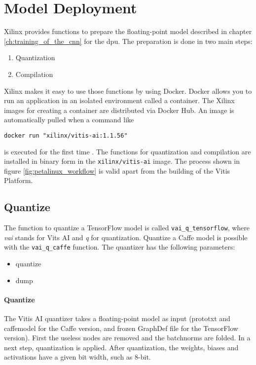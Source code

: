 \section{Model Deployment}
\label{sec:embedded_platform:model_deployment}

Xilinx provides functions to prepare the floating-point model described in chapter \ref{ch:training_of_the_cnn} for the \acrshort{dpu}.
The preparation is done in two main steps:
\begin{enumerate}
	\item Quantization
	\item Compilation
\end{enumerate}
Xilinx makes it easy to use those functions by using Docker.
Docker allows you to run an application in an isolated environment called a container.
The Xilinx images for creating a container are distributed via Docker Hub.
An image is automatically pulled when a command like
\begin{lstlisting}[style=bash, caption={}, label=lst:pull_img]
  docker run "xilinx/vitis-ai:1.1.56"
\end{lstlisting}
is executed for the first time \cite{docker_overview}.
The functions for quantization and compilation are installed in binary form in the \texttt{xilinx/vitis-ai} image.
The process shown in figure \ref{fig:petalinux_workflow} is valid apart from the building of the Vitis Platform.

\subsection{Quantize}
\label{subsec:embedded_platform:model_deployment:quantize}
The function to quantize a TensorFlow model is called \texttt{vai\_q\_tensorflow}, where \textit{vai} stands for Vits AI and \textit{q} for quantization.
Quantize a Caffe model is possible with the \texttt{vai\_q\_caffe} function.
The quantizer has the following parameters:
\begin{itemize}
	\item quantize
	\item dump
\end{itemize}

\paragraph{Quantize}
The Vitis AI quantizer takes a floating-point model as input (prototxt and caffemodel for the Caffe version, and frozen GraphDef file for the TensorFlow version).
First the useless nodes are removed and the batchnorms are folded.
In a next step, quantization is applied.
After quantization, the weights, biases and activations have a given bit width, such as 8-bit.


